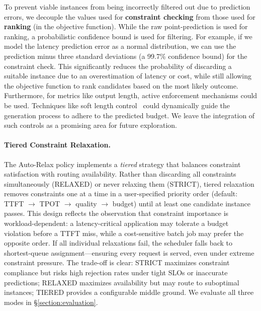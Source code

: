 \documentclass[letterpaper, anonymous, twocolumn, 10pt]{article}
\begin{document}
To prevent viable instances from being incorrectly filtered out due to prediction errors, we decouple the values used for \textbf{constraint checking} from those used for \textbf{ranking} (in the objective function). While the raw point-prediction is used for ranking, a probabilistic confidence bound is used for filtering. For example, if we model the latency prediction error as a normal distribution, we can use the prediction minus three standard deviations (a 99.7\% confidence bound) for the constraint check. This significantly reduces the probability of discarding a suitable instance due to an overestimation of latency or cost, while still allowing the objective function to rank candidates based on the most likely outcome.
Furthermore, for metrics like output length, active enforcement mechanisms could be used. Techniques like soft length control~\cite{Butcher_2025, gu-etal-2025-length} could dynamically guide the generation process to adhere to the predicted budget. We leave the integration of such controls as a promising area for future exploration.

\paragraph{Tiered Constraint Relaxation.}
The Auto-Relax policy implements a \emph{tiered} strategy that balances constraint satisfaction with routing availability.
Rather than discarding all constraints simultaneously (RELAXED) or never relaxing them (STRICT), tiered relaxation removes constraints one at a time in a user-specified priority order (default: TTFT $\rightarrow$ TPOT $\rightarrow$ quality $\rightarrow$ budget) until at least one candidate instance passes.
This design reflects the observation that constraint importance is workload-dependent: a latency-critical application may tolerate a budget violation before a TTFT miss, while a cost-sensitive batch job may prefer the opposite order.
If all individual relaxations fail, the scheduler falls back to shortest-queue assignment---ensuring every request is served, even under extreme constraint pressure.
The trade-off is clear: STRICT maximizes constraint compliance but risks high rejection rates under tight SLOs or inaccurate predictions; RELAXED maximizes availability but may route to suboptimal instances; TIERED provides a configurable middle ground.
We evaluate all three modes in \S\ref{section:evaluation}.
\end{document}
